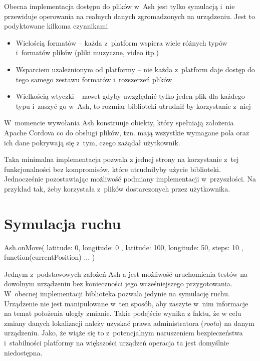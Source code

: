\documentclass[brudnopis]{xmgr}
\begin{document}
Obecna implementacja dostępu do plików w~Ash jest tylko symulacją i~nie przewiduje operowania na realnych danych zgromadzonych na urządzeniu. Jest to podyktowane kilkoma czynnikami

\begin{itemize}
  \item Wielością formatów -- każda z~platform wspiera wiele różnych typów i~formatów plików (pliki muzyczne, video itp.) 
  \item Wsparciem uzależnionym od platformy -- nie każda z~platform daje dostęp do tego samego zestawu formatów i~rozszerzeń plików
  \item Wielkością wtyczki -- nawet gdyby uwzględnić tylko jeden plik dla każdego typu i~zaszyć go w~Ash, to rozmiar biblioteki utrudnił by korzystanie z~niej
\end{itemize}

W~momencie wywołania Ash konstruuje obiekty, który spełniają założenia Apache Cordova co do obsługi plików, tzn. mają wszystkie wymagane pola oraz ich dane pokrywają się z~tym, czego zażądał użytkownik. 

Taka minimalna implementacja pozwala z jednej strony  na korzystanie z~tej funkcjonalności bez kompromisów, które utrudniłyby użycie biblioteki. Jednocześnie pozostawiając możliwość podmiany implementacji w~przyszłości. Na przykład tak, żeby korzystała z~plików dostarczonych przez użytkownika.

\section{Symulacja ruchu}

\begin{javascriptcode}
Ash.onMove({
    latitude: 0, 
    longitude: 0
}, {
    latitude: 100, 
    longitude: 50, 
    steps: 10
}, function(currentPosition){ ... })
\end{javascriptcode}

Jednym z~podstawowych założeń Ash-a jest możliwość uruchomienia testów na dowolnym urządzeniu bez konieczności jego wcześniejszego przygotowania. W~obecnej implementacji biblioteka pozwala jedynie na symulację ruchu. Urządzenie nie jest manipulowane w~ten sposób, aby zaszyte w~nim informacje na temat położenia uległy zmianie. Takie podejście wynika z faktu, że w celu zmiany danych lokalizacji należy uzyskać prawa administratora (\textit{roota}) na danym urządzeniu. Jako, że wiąże się to z~potencjalnym naruszeniem bezpieczeństwa i~stabilności platformy na większości urządzeń operacja ta jest domyślnie niedostępna. 
\end{document}
